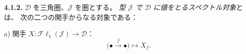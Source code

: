 \medskip\noindent\textbf{4.1.2.}\quad
$\mathcal D$ を三角圏、$\mathcal J$ を圏とする。
\emph{型 $\mathcal J$ で $\mathcal D$ に値をとるスペクトル対象}とは、
次の二つの関手からなる対象である：

a) 関手
$X\colon\mathcal{F}\ell_1(\mathcal J)\longrightarrow\mathcal D$：
\[
\bigl(\mathord\bullet\xrightarrow f\mathord\bullet\bigr)\longmapsto X_f.
\]
\endgroup
